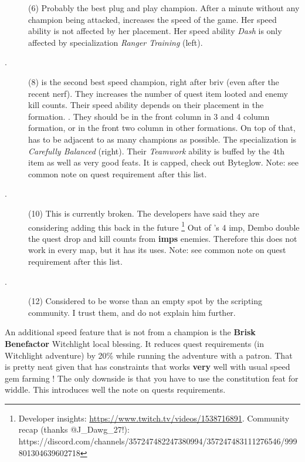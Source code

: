 \documentclass{article}
\begin{document}
\begin{description}
    \item[\shandie] (6) Probably the best plug and play champion.
    After a minute without any champion being attacked, \shandie increases the speed of the game.
    Her speed ability is not affected by her placement.
    Her speed ability \textit{Dash} is only affected by specialization \textit{Ranger Training} (left).
    
    \item[\hewmaan.] (8) \hewmaan is the second best speed champion, right after briv (even after the recent nerf).
    They increases the number of quest item looted and enemy kill counts.
    Their speed ability depends on their placement in the formation.
    \hewmaan.
    They should be in the front column in 3 and 4 column formation, or in the front two column in other formations.
    On top of that, \hewmaan has to be adjacent to as many champions as possible.
    The specialization is \textit{Carefully Balanced} (right).
    Their \textit{Teamwork} ability is buffed by the 4th item as well as very good feats.
    It is capped, check out Byteglow.
    Note: see common note on quest requirement after this list.
    \item[\havilar.] (10) This is currently broken.
    The developers have said they are considering adding this back in the future \footnote{Developer insights: \url{https://www.twitch.tv/videos/1538716891}.
    Community recap (thanks @J\_Dawg\_27!): https://discord.com/channels/357247482247380994/357247483111276546/999801304639602718}
    Out of \havilar's 4 imp, Dembo double the quest drop and kill counts from \textbf{imps} enemies.
    Therefore this does not work in every map, but it has its uses.
    Note: see common note on quest requirement after this list.
    \item[\melf.] (12) Considered to be worse than an empty spot by the scripting community.
    I trust them, and do not explain him further.
\end{description}

An additional speed feature that is not from a champion is the \textbf{Brisk Benefactor} Witchlight local blessing.
It reduces quest requirements (in Witchlight adventure) by 20\% while running the adventure with a patron.
That is pretty neat given that \vjara has constraints that works \textbf{very} well with usual speed gem farming !
The only downside is that you have to use the constitution feat for widdle.
This introduces well the note on quests requirements.
\end{document}
